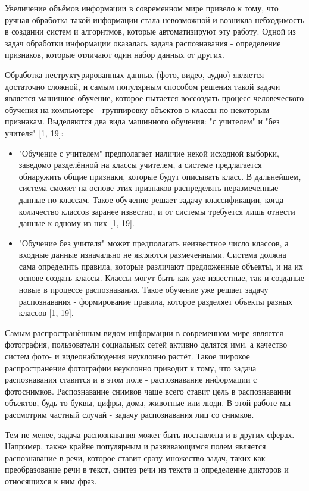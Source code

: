 \documentclass[12pt,a4paper]{article}
\begin{document}
Увеличение объёмов информации в современном мире привело к тому, что ручная обработка такой информации стала невозможной и возникла небходимость в создании систем и алгоритмов, которые автоматизируют эту работу. Одной из задач обработки информации оказалась задача распознавания - определение признаков, которые отличают один набор данных от других.

Обработка неструктурированных данных (фото, видео, аудио) является достаточно сложной, и самым популярным способом решения такой задачи является машинное обучение, которое пытается воссоздать процесс человеческого обучения на компьютере - группировку объектов в классы по некоторым признакам. Выделяются два вида машинного обучения: "с учителем" и "без учителя" [1, 19]:
\begin{itemize}
    \item "Обучение с учителем" предполагает наличие некой исходной выборки, заведомо разделённой на классы учителем, а системе предлагается обнаружить общие признаки, которые будут описывать класс. В дальнейшем, система сможет на основе этих признаков распределять неразмеченные данные по классам. Такое обучение решает задачу классификации, когда количество классов заранее известно, и от системы требуется лишь отнести данные к одному из них [1, 19].
    \item "Обучение без учителя" может предполагать неизвестное число классов, а входные данные изначально не являются размеченными. Система должна сама определить правила, которые различают предложенные объекты, и на их основе создать классы. Классы могут быть как уже известные, так и созданые новые в процессе распознавания. Такое обучение уже решает задачу распознавания - формирование правила, которое разделяет объекты разных классов [1, 19].
\end{itemize}

Самым распространённым видом информации в современном мире является фотография, пользователи социальных сетей активно делятся ими, а качество систем фото- и видеонаблюдения неуклонно растёт. Такое широкое распространение фотографии неуклонно приводит к тому, что задача распознавания ставится и в этом поле - распознавание информации с фотоснимков. Распознавание снимков чаще всего ставит цель в распознавании объектов, будь то буквы, цифры, дома, животные или люди. В этой работе мы рассмотрим частный случай - задачу распознавания лиц со снимков.

Тем не менее, задача распознавания может быть поставлена и в других сферах. Например, также крайне популярным и развивающимся полем является распознавание в речи, которое ставит сразу множество задач, таких как преобразование речи в текст, синтез речи из текста и определение дикторов и относящихся к ним фраз.
\end{document}
